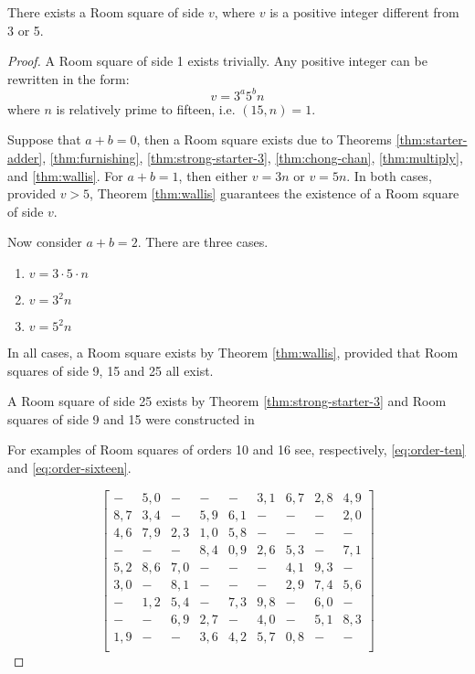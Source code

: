 \begin{theorem}
There exists a Room square of side $v$, where $v$ is a positive integer different from 3 or 5.
\end{theorem}

\begin{proof}
A Room square of side 1 exists trivially.
Any positive integer can be rewritten in the form:
\begin{equation}
v = 3^{a}5^{b}n
\end{equation}
where $n$ is relatively prime to fifteen, i.e. $(15, n) = 1$.

Suppose that $a + b = 0$, then a Room square exists due to Theorems
\ref{thm:starter-adder},
\ref{thm:furnishing},
\ref{thm:strong-starter-3},
\ref{thm:chong-chan},
\ref{thm:multiply},
and
\ref{thm:wallis}.
For $a + b = 1$, then either $v = 3n$ or $v = 5n$.
In both cases, provided $v > 5$, Theorem \ref{thm:wallis} guarantees the existence of a Room square of side $v$.

Now consider $a + b = 2$.
There are three cases.

\begin{enumerate}
  \item{$v = 3\cdot 5\cdot n$}
  \item{$v = 3^{2}n$}
  \item{$v = 5^{2}n$}
\end{enumerate}

In all cases, a Room square exists by Theorem \ref{thm:wallis}, provided that Room squares of side 9, 15 and 25 all exist.

A Room square of side 25 exists by Theorem \ref{thm:strong-starter-3} and Room squares of side 9 and 15 were constructed in
\cite{mullinFurnishingRoomSquares1969}

For examples of Room squares of orders 10 and 16 see, respectively, \eqref{eq:order-ten} and \eqref{eq:order-sixteen}.

\begin{equation}
  \begin{bmatrix}
    -  & 5,0 &  -  &  -  &  -  & 3,1 & 6,7 & 2,8 & 4,9 \\ 
   8,7 & 3,4 &  -  & 5,9 & 6,1 &  -  &  -  &  -  & 2,0 \\ 
   4,6 & 7,9 & 2,3 & 1,0 & 5,8 &  -  &  -  &  -  &  -  \\ 
    -  &  -  &  -  & 8,4 & 0,9 & 2,6 & 5,3 &  -  & 7,1 \\ 
   5,2 & 8,6 & 7,0 &  -  &  -  &  -  & 4,1 & 9,3 &  -  \\ 
   3,0 &  -  & 8,1 &  -  &  -  &  -  & 2,9 & 7,4 & 5,6 \\ 
    -  & 1,2 & 5,4 &  -  & 7,3 & 9,8 &  -  & 6,0 &  -  \\ 
    -  &  -  & 6,9 & 2,7 &  -  & 4,0 &  -  & 5,1 & 8,3 \\ 
   1,9 &  -  &  -  & 3,6 & 4,2 & 5,7 & 0,8 &  -  &  -  \\ 
  \end{bmatrix}
  \label{eq:order-ten}
\end{equation}


\end{proof}
